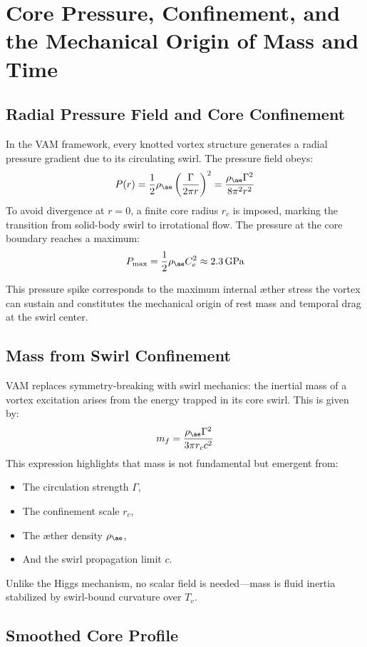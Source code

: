 \section{Core Pressure, Confinement, and the Mechanical Origin of Mass and Time}

\subsection{Radial Pressure Field and Core Confinement}

In the VAM framework, every knotted vortex structure generates a radial pressure gradient due to its circulating swirl. The pressure field obeys:
\[
P(r) = \frac{1}{2} \rho_{\ae} \left( \frac{\Gamma}{2\pi r} \right)^2 = \frac{\rho_{\ae} \Gamma^2}{8\pi^2 r^2}
\]
To avoid divergence at \( r = 0 \), a finite core radius \( r_c \) is imposed, marking the transition from solid-body swirl to irrotational flow. The pressure at the core boundary reaches a maximum:
\[
P_{\text{max}} = \frac{1}{2} \rho_{\ae} C_e^2 \approx 2.3\,\text{GPa}
\]

This pressure spike corresponds to the maximum internal æther stress the vortex can sustain and constitutes the mechanical origin of rest mass and temporal drag at the swirl center.

\subsection{Mass from Swirl Confinement}
\label{subsec:mass-from-swirl}

VAM replaces symmetry-breaking with swirl mechanics: the inertial mass of a vortex excitation arises from the energy trapped in its core swirl. This is given by:
\[
m_f = \frac{\rho_{\ae} \Gamma^2}{3\pi r_c c^2}
\]
This expression highlights that mass is not fundamental but emergent from:
\begin{itemize}
    \item The circulation strength \( \Gamma \),
    \item The confinement scale \( r_c \),
    \item The æther density \( \rho_{\ae} \),
    \item And the swirl propagation limit \( c \).
\end{itemize}
Unlike the Higgs mechanism, no scalar field is needed—mass is fluid inertia stabilized by swirl-bound curvature over \( T_v \).

\subsection{Smoothed Core Profile}

